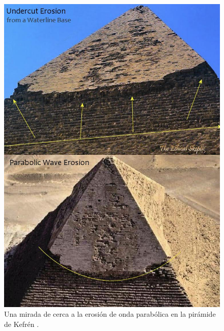 \documentclass[10pt,twocolumn,letterpaper]{article}
\begin{document}
\begin{figure}[H]
\begin{center}
   \includegraphics[width=1\linewidth]{wave.jpg}
\end{center}
   \caption{Una mirada de cerca a la erosión de onda parabólica en la pirámide de Kefrén \cite{27}.}
\label{fig:19}
\label{fig:onecol}
\end{figure}
\end{document}
